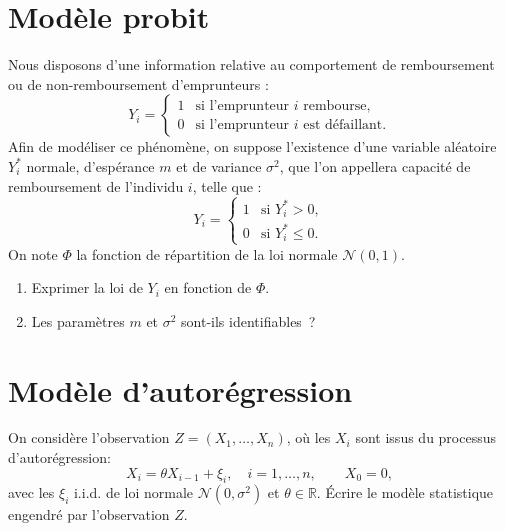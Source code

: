 \documentclass[a4paper,11pt,fleqn]{article}
\newcommand{\R}{\ensuremath{\mathbb{R}}}
\newcommand{\1}{\ensuremath{\mathbbm{1}}}
\begin{document}
\section{Mod\`ele probit} 
\label{probit}
Nous disposons d'une information relative au comportement de remboursement ou
de non-remboursement d'emprunteurs :
\begin{equation*}
Y_{i}=\left\{
    \begin{array}{cc}
      1 & \text{si l'emprunteur }i\text{ rembourse}, \\
      0 & \text{si l'emprunteur }i\text{ est d\'efaillant}.%
    \end{array}%
  \right.
\end{equation*}%
Afin de mod\'eliser ce ph\'enom\`ene, on suppose l'existence d'une variable al\'eatoire
$Y_{i}^{\ast }$ normale, d'esp\'erance $m$ et de variance $\sigma ^{2}$, que l'on
appellera {\og}capacit\'e de remboursement de l'individu $i${\fg}, telle que :
\begin{equation*}
  Y_{i}=\left\{
    \begin{array}{cc}
      1 & \text{si }Y_{i}^{\ast }>0, \\
      0 & \text{si }Y_{i}^{\ast }\leq 0.%
    \end{array}%
  \right.
\end{equation*}
On note $\Phi$ la fonction de r\'epartition de la loi normale $\mathcal{N}%
\left( 0,1\right) $.
\begin{enumerate}
\item Exprimer la loi de $Y_{i}$ en fonction de $\Phi$.
\item Les param\`etres $m$ et $\sigma^{2}$ sont-ils identifiables~?
\end{enumerate}



\section{Mod\`ele d'autor\'egression}

On consid\`ere l'observation $Z=(X_1,\dots,X_n)$, o\`u les $X_i$
sont issus du processus d'autor\'egression:
$$
X_i=\theta X_{i-1} + \xi_i, \quad i=1,\dots,n, \quad\quad X_0=0,
$$
avec les $\xi_i$ i.i.d. de loi normale ${\mathcal N}(0,\sigma^2)$ et
$\theta\in \R$. \'Ecrire le mod\`ele statistique engendr\'e
par l'observation $Z$.
\end{document}
